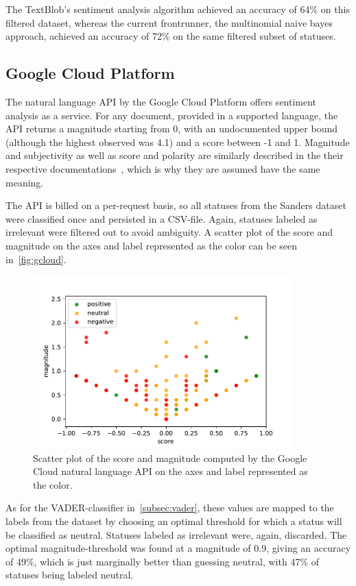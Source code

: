 The TextBlob's sentiment analysis algorithm achieved an accuracy of 64\% on this filtered dataset,
whereas the current frontrunner, the multinomial naive bayes approach,
achieved an accuracy of 72\% on the same filtered subset of statuses.

\subsection{Google Cloud Platform}
\label{subsec:googlecloud}

The natural language API by the Google Cloud Platform offers sentiment analysis as a service.
For any document, provided in a supported language, the API returns a magnitude starting from 0, with an undocumented upper bound
(although the highest observed was 4.1) and a score between -1 and 1.
Magnitude and subjectivity as well as score and polarity are similarly described in the their respective documentations~\cite{gcloudDocs}\cite{textblobDocs},
which is why they are assumed have the same meaning.
\par
The API is billed on a per-request basis, so all statuses from the Sanders dataset were classified once and persisted in a CSV-file.
Again, statuses labeled as irrelevant were filtered out to avoid ambiguity.
A scatter plot of the score and magnitude on the axes and label represented as the color can be seen in~\autoref{fig:gcloud}.

\begin{figure}
    \centering
    \caption{Scatter plot of the score and magnitude computed by the Google Cloud natural language API on the axes and label represented as the color.}
    \label{fig:gcloud}
    \includegraphics[width=10cm]{../figures/gcloud.pdf}
\end{figure}

As for the VADER-classifier in~\autoref{subsec:vader}, these values are mapped to the labels from the dataset by
choosing an optimal threshold for which a status will be classified as neutral.
Statuses labeled as irrelevant were, again, discarded.
The optimal magnitude-threshold was found at a magnitude of 0.9, giving an accuracy of 49\%,
which is just marginally better than guessing neutral, with 47\% of statuses being labeled neutral.

